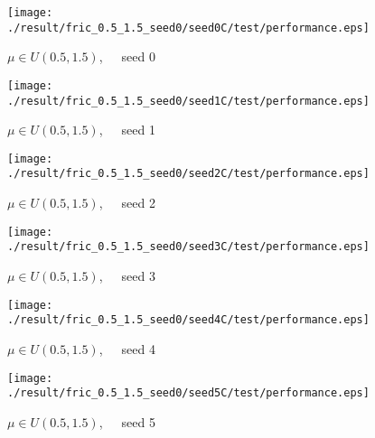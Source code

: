 \begin{figure}[p]
 \begin{minipage}{0.49\hsize}
  \begin{center}
 \texttt{[image: ./result/fric\_0.5\_1.5\_seed0/seed0C/test/performance.eps]}
  \caption{$\mu\in U(0.5,1.5)$,~~~seed 0
  }
  \end{center}
 \end{minipage}
 \begin{minipage}{0.49\hsize}
   \begin{center}
 \texttt{[image: ./result/fric\_0.5\_1.5\_seed0/seed1C/test/performance.eps]}
  \caption{$\mu\in U(0.5,1.5)$,~~~seed 1
  }
  \end{center}
 \end{minipage}
\end{figure}

\begin{figure}[p]
 \begin{minipage}{0.49\hsize}
  \begin{center}
 \texttt{[image: ./result/fric\_0.5\_1.5\_seed0/seed2C/test/performance.eps]}
  \caption{$\mu\in U(0.5,1.5)$,~~~seed 2
  }
  \end{center}
 \end{minipage}
 \begin{minipage}{0.49\hsize}
   \begin{center}
 \texttt{[image: ./result/fric\_0.5\_1.5\_seed0/seed3C/test/performance.eps]}
  \caption{$\mu\in U(0.5,1.5)$,~~~seed 3
  }
  \end{center}
 \end{minipage}
\end{figure}

\begin{figure}[p]
 \begin{minipage}{0.49\hsize}
  \begin{center}
 \texttt{[image: ./result/fric\_0.5\_1.5\_seed0/seed4C/test/performance.eps]}
  \caption{$\mu\in U(0.5,1.5)$,~~~seed 4
  }
  \end{center}
 \end{minipage}
 \begin{minipage}{0.49\hsize}
   \begin{center}
 \texttt{[image: ./result/fric\_0.5\_1.5\_seed0/seed5C/test/performance.eps]}
  \caption{$\mu\in U(0.5,1.5)$,~~~seed 5
  }
  \end{center}
 \end{minipage}
\end{figure}
